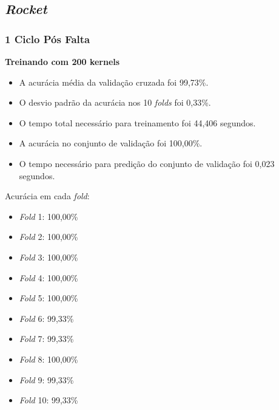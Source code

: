\subsection{\textit{Rocket}}
\subsubsection{1 Ciclo Pós Falta}
\textbf{Treinando com 200 kernels}
\begin{itemize}
    \item A acurácia média da validação cruzada foi 99,73\%.
    \item O desvio padrão da acurácia nos 10 \textit{folds} foi 0,33\%.
    \item O tempo total necessário para treinamento foi 44,406 segundos.
    \item A acurácia no conjunto de validação foi 100,00\%.
    \item O tempo necessário para predição do conjunto de validação foi 0,023 segundos.
\end{itemize}
Acurácia em cada \textit{fold}:
\begin{itemize}
    \item \textit{Fold} 1: 100,00\%
    \item \textit{Fold} 2: 100,00\%
    \item \textit{Fold} 3: 100,00\%
    \item \textit{Fold} 4: 100,00\%
    \item \textit{Fold} 5: 100,00\%
    \item \textit{Fold} 6: 99,33\%
    \item \textit{Fold} 7: 99,33\%
    \item \textit{Fold} 8: 100,00\%
    \item \textit{Fold} 9: 99,33\%
    \item \textit{Fold} 10: 99,33\%
\end{itemize}

